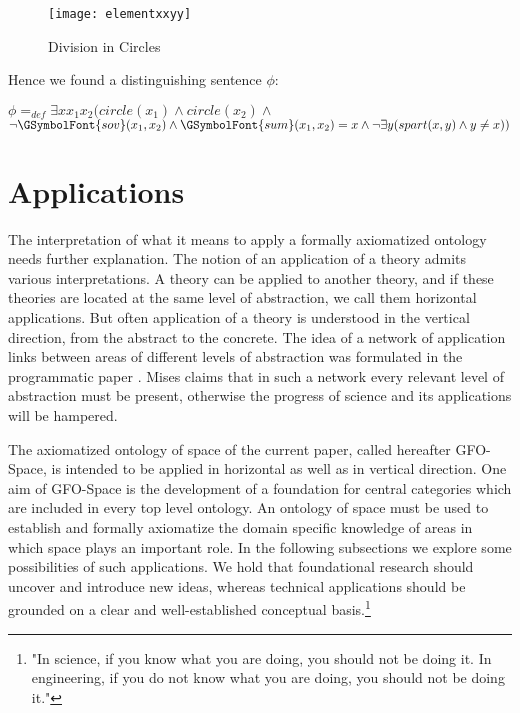 \documentclass{ao2e}
\newcommand{\Gsov}{\ensuremath{\GSymbolFont{sov}}}
\newcommand{\Gsum}{\ensuremath{\GSymbolFont{sum}}}
\begin{document}
{\begin{figure}[H]
\centering
\texttt{[image: elementxxyy]}
\caption{Division in Circles}
\label{SSP}
\end{figure}

Hence we found a distinguishing sentence $\phi$:

\noindent $\phi =_{def} \exists x x_1x_2 ( circle(x_1) \wedge circle(x_2) \wedge $ $\neg\Gsov(x_1,x_2) \wedge \Gsum(x_1,x_2) = x \wedge  \neg \exists y ( spart(x,y) \wedge  y \not= x))$








\section{Applications}

The interpretation of what it means to apply a formally axiomatized ontology needs further explanation.
The notion of an application of a theory admits various interpretations. A theory can be applied to another theory, and if these theories are located at the same level of abstraction, we call them horizontal applications. But often application of a theory is understood in the vertical direction, from the abstract to the concrete. The idea of a network of application links between areas of different levels of abstraction was formulated in the programmatic paper \cite{mises-r-1921-a}. Mises claims that in such a network every relevant level of abstraction must be present, otherwise the progress of science and its applications will be hampered.

The axiomatized ontology of space of the current paper, called hereafter GFO-Space, is intended
to be applied in horizontal as well as in vertical direction. One aim of GFO-Space is the development of a foundation for central categories which are included in every top level ontology.
An ontology of space must be used to establish and formally axiomatize the domain specific knowledge of areas in which space plays an important role. In the following subsections we explore some possibilities of such applications. We hold that foundational research should uncover and introduce new ideas, whereas technical applications should be grounded on a clear and well-established conceptual basis.\footnote{\cite{hamming-w-1997-a}
"In science, if you know what you are doing, you should not be doing it. In engineering, if you do not know what you are doing, you should not be doing it."}




}
\end{document}
